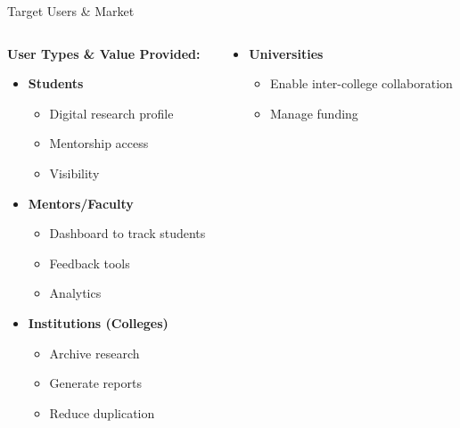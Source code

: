 \documentclass[aspectratio=169]{beamer}
\begin{document}
\begin{frame}{Target Users \& Market}

\begin{columns}[t]
\begin{column}{0.5\textwidth}
\textbf{User Types \& Value Provided:}
\vspace{0.3cm}

\begin{itemize}
\item \textbf{Students}
    \begin{itemize}
    \item Digital research profile
    \item Mentorship access
    \item Visibility
    \end{itemize}

\vspace{0.2cm}

\item \textbf{Mentors/Faculty}
    \begin{itemize}
    \item Dashboard to track students
    \item Feedback tools
    \item Analytics
    \end{itemize}

\vspace{0.2cm}

\item \textbf{Institutions (Colleges)}
    \begin{itemize}
    \item Archive research
    \item Generate reports
    \item Reduce duplication
    \end{itemize}
\end{itemize}
\end{column}

\begin{column}{0.5\textwidth}
\begin{itemize}
\item \textbf{Universities}
    \begin{itemize}
    \item Enable inter-college collaboration
    \item Manage funding
    \end{itemize}

\vspace{0.2cm}


\end{itemize}
\end{column}
\end{columns}
\end{frame}
\end{document}
